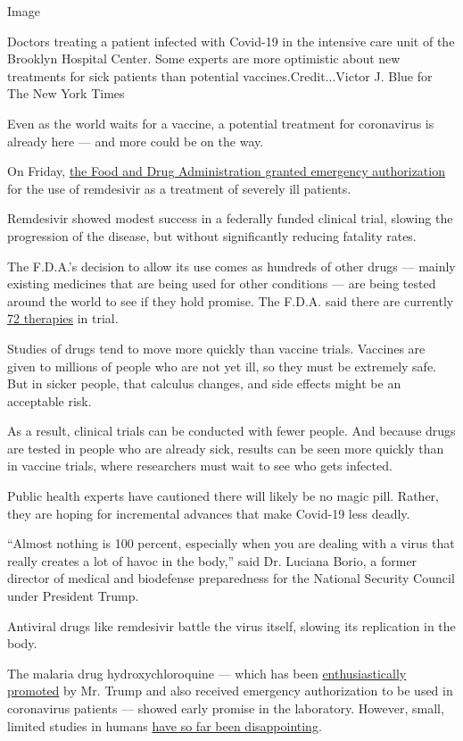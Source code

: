 Image

Doctors treating a patient infected with Covid-19 in the intensive care
unit of the Brooklyn Hospital Center. Some experts are more optimistic
about new treatments for sick patients than potential
vaccines.Credit...Victor J. Blue for The New York Times

Even as the world waits for a vaccine, a potential treatment for
coronavirus is already here --- and more could be on the way.

On Friday,
\href{https://www.nytimes.com/2020/05/01/health/coronavirus-remdesivir.html}{the
Food and Drug Administration granted emergency authorization} for the
use of remdesivir as a treatment of severely ill patients.

Remdesivir showed modest success in a federally funded clinical trial,
slowing the progression of the disease, but without significantly
reducing fatality rates.

The F.D.A.'s decision to allow its use comes as hundreds of other drugs
--- mainly existing medicines that are being used for other conditions
--- are being tested around the world to see if they hold promise. The
F.D.A. said there are currently
\href{https://www.fda.gov/drugs/coronavirus-covid-19-drugs/coronavirus-treatment-acceleration-program-ctap}{72
therapies} in trial.

Studies of drugs tend to move more quickly than vaccine trials. Vaccines
are given to millions of people who are not yet ill, so they must be
extremely safe. But in sicker people, that calculus changes, and side
effects might be an acceptable risk.

As a result, clinical trials can be conducted with fewer people. And
because drugs are tested in people who are already sick, results can be
seen more quickly than in vaccine trials, where researchers must wait to
see who gets infected.

Public health experts have cautioned there will likely be no magic pill.
Rather, they are hoping for incremental advances that make Covid-19 less
deadly.

``Almost nothing is 100 percent, especially when you are dealing with a
virus that really creates a lot of havoc in the body,'' said Dr. Luciana
Borio, a former director of medical and biodefense preparedness for the
National Security Council under President Trump.

Antiviral drugs like remdesivir battle the virus itself, slowing its
replication in the body.

The malaria drug hydroxychloroquine --- which has been
\href{https://www.nytimes.com/2020/04/06/us/politics/coronavirus-trump-malaria-drug.html}{enthusiastically
promoted} by Mr. Trump and also received emergency authorization to be
used in coronavirus patients --- showed early promise in the laboratory.
However, small, limited studies in humans
\href{https://www.nytimes.com/2020/04/24/health/fda-hydroxychloroquine-coronavirus.html}{have
so far been disappointing}.

